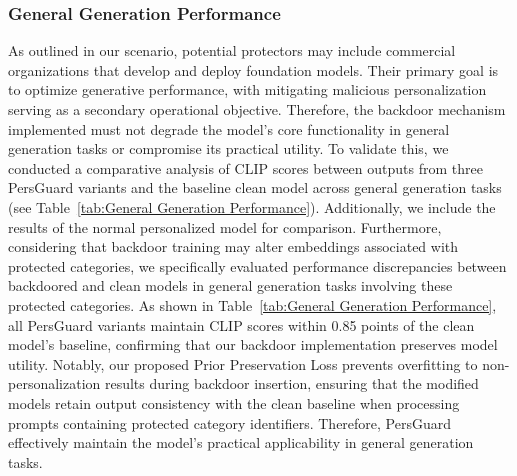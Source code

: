 \subsubsection{General Generation Performance}
As outlined in our scenario, potential protectors may include commercial organizations that develop and deploy foundation models. Their primary goal is to optimize generative performance, with mitigating malicious personalization serving as a secondary operational objective. Therefore, the backdoor mechanism implemented must not degrade the model's core functionality in general generation tasks or compromise its practical utility. To validate this, we conducted a comparative analysis of CLIP scores between outputs from three PersGuard variants and the baseline clean model across general generation tasks (see Table~\ref{tab:General Generation Performance}). Additionally, we include the results of the normal personalized model for comparison. Furthermore, considering that backdoor training may alter embeddings associated with protected categories, we specifically evaluated performance discrepancies between backdoored and clean models in general generation tasks involving these protected categories. As shown in Table~\ref{tab:General Generation Performance}, all PersGuard variants maintain CLIP scores within 0.85 points of the clean model's baseline, confirming that our backdoor implementation preserves model utility. Notably, our proposed Prior Preservation Loss prevents overfitting to non-personalization results during backdoor insertion, ensuring that the modified models retain output consistency with the clean baseline when processing prompts containing protected category identifiers. Therefore, PersGuard effectively maintain the model's practical applicability in general generation tasks.



\begin{table}[t]
\centering
\caption{Comparison of the performance between backdoored and clean models in general generation tasks and general protected category generation tasks.}
\label{tab:General Generation Performance}
\end{table}

